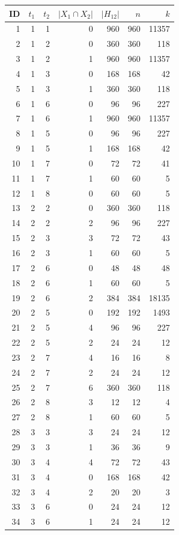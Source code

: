 \documentclass[11pt,a4paper]{article}
\begin{document}
\begin{longtable}{r|rrrr|rr}\toprule
ID&$t_1$&$t_2$&$|X_1\cap X_2|$&$|H_{12}|$&$n$&$k$\\\midrule\endhead
1 & 1 & 1 & 0 & 960 & 960 & 11357\\
2 & 1 & 2 & 0 & 360 & 360 & 118\\
3 & 1 & 2 & 1 & 960 & 960 & 11357\\
4 & 1 & 3 & 0 & 168 & 168 & 42\\
5 & 1 & 3 & 1 & 360 & 360 & 118\\
6 & 1 & 6 & 0 & 96 & 96 & 227\\
7 & 1 & 6 & 1 & 960 & 960 & 11357\\
8 & 1 & 5 & 0 & 96 & 96 & 227\\
9 & 1 & 5 & 1 & 168 & 168 & 42\\
10 & 1 & 7 & 0 & 72 & 72 & 41\\
11 & 1 & 7 & 1 & 60 & 60 & 5\\
12 & 1 & 8 & 0 & 60 & 60 & 5\\
13 & 2 & 2 & 0 & 360 & 360 & 118\\
14 & 2 & 2 & 2 & 96 & 96 & 227\\
15 & 2 & 3 & 3 & 72 & 72 & 43\\
16 & 2 & 3 & 1 & 60 & 60 & 5\\
17 & 2 & 6 & 0 & 48 & 48 & 48\\
18 & 2 & 6 & 1 & 60 & 60 & 5\\
19 & 2 & 6 & 2 & 384 & 384 & 18135\\
20 & 2 & 5 & 0 & 192 & 192 & 1493\\
21 & 2 & 5 & 4 & 96 & 96 & 227\\
22 & 2 & 5 & 2 & 24 & 24 & 12\\
23 & 2 & 7 & 4 & 16 & 16 & 8\\
24 & 2 & 7 & 2 & 24 & 24 & 12\\
25 & 2 & 7 & 6 & 360 & 360 & 118\\
26 & 2 & 8 & 3 & 12 & 12 & 4\\
27 & 2 & 8 & 1 & 60 & 60 & 5\\
28 & 3 & 3 & 3 & 24 & 24 & 12\\
29 & 3 & 3 & 1 & 36 & 36 & 9\\
30 & 3 & 4 & 4 & 72 & 72 & 43\\
31 & 3 & 4 & 0 & 168 & 168 & 42\\
32 & 3 & 4 & 2 & 20 & 20 & 3\\
33 & 3 & 6 & 0 & 24 & 24 & 12\\
34 & 3 & 6 & 1 & 24 & 24 & 12\\

\end{longtable}
\end{document}
